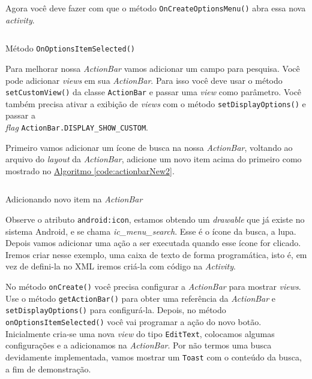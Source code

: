 \documentclass[a4paper,12pt,brazil,oneside]{book}
\begin{document}
\begin{singlespace}
		
		Agora você deve fazer com que o método \texttt{OnCreateOptionsMenu()} abra essa nova \emph{activity}.
		
		\begin{listing}[H]
		\inputminted[linenos=true,fontsize=\small,frame=lines, framesep=2mm, tabsize=2,numbersep=5pt]{java}{src/design/onoptionsitemselected.java}
		\caption{Método \texttt{OnOptionsItemSelected()}}
		\end{listing}

		Para melhorar nossa \emph{ActionBar} vamos adicionar um campo para pesquisa. Você pode adicionar \emph{views} em sua \emph{ActionBar}. Para isso você deve usar o método \texttt{setCustomView()}  da classe \texttt{ActionBar} e passar uma \emph{view} como parâmetro. Você também precisa ativar a exibição de \emph{views} com o método \texttt{setDisplayOptions()} e passar a \\ \emph{flag} \texttt{ActionBar.DISPLAY\_SHOW\_CUSTOM}.
		
		Primeiro vamos adicionar um ícone de busca na nossa \emph{ActionBar}, voltando ao arquivo do \emph{layout} da \emph{ActionBar}, adicione um novo item acima do primeiro como mostrado no \hyperref[code:actionbarNew2]{Algoritmo \ref*{code:actionbarNew2}}.
		
		\begin{listing}[H]
		\inputminted[linenos=true,fontsize=\small,frame=lines, framesep=2mm, tabsize=2,numbersep=5pt]{xml}{src/design/newitem.xml}
		\caption{Adicionando novo item na \emph{ActionBar}}
		\label{code:actionbarNew2}
		\end{listing}
		
		Observe o atributo \texttt{android:icon}, estamos obtendo um \emph{drawable} que já existe no sistema Android, e se chama \emph{ic\_menu\_search}. Esse é o ícone da busca, a lupa. Depois vamos adicionar uma ação a ser executada quando esse ícone for clicado. Iremos criar nesse exemplo, uma caixa de texto de forma programática, isto é, em vez de defini-la no XML iremos criá-la com código na \emph{Activity}. 
		
		No método \texttt{onCreate()} você precisa configurar a \emph{ActionBar} para mostrar \emph{views}. Use o método \texttt{getActionBar()} para obter uma referência da \emph{ActionBar} e \texttt{setDisplayOptions()} para configurá-la. Depois, no método \texttt{onOptionsItemSelected()} você vai programar a ação do novo botão. Inicialmente cria-se uma nova \emph{view} do tipo \texttt{EditText}, colocamos algumas configurações e a adicionamos na \emph{ActionBar}. Por não termos uma busca devidamente implementada, vamos mostrar um \texttt{Toast} com o conteúdo da busca, a fim de demonstração.
		

\end{singlespace}
\end{document}
